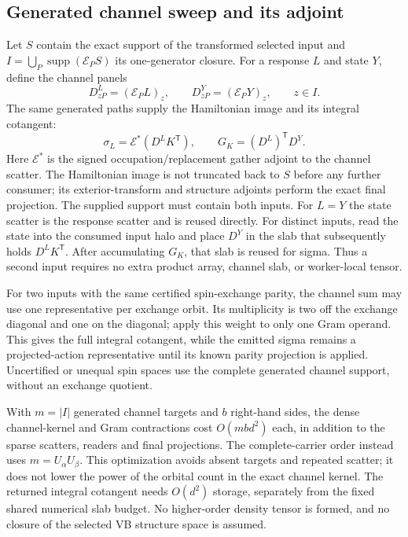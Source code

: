 \documentclass[11pt,a4paper]{article}
\newcommand{\Tr}{^{\mathsf T}}
\newcommand{\Ea}{\mathcal E}
\begin{document}
\subsection{Generated channel sweep and its adjoint}

Let $S$ contain the exact support of the transformed selected input and
$I=\bigcup_P\operatorname{supp}(\Ea_P S)$ its one-generator closure.
For a response $L$ and state $Y$, define the channel panels
\begin{equation}
 D^L_{zP}=(\Ea_P L)_z,\qquad D^Y_{zP}=(\Ea_P Y)_z,
 \qquad z\in I.
\end{equation}
The same generated paths supply the Hamiltonian image and its integral
cotangent:
\begin{equation}
 \sigma_L=\Ea^* (D^L K\Tr),\qquad
 G_K=(D^L)\Tr D^Y.
 \label{eq:tiled-channel-vjp}
\end{equation}
Here $\Ea^*$ is the signed occupation/replacement gather adjoint to the
channel scatter. The Hamiltonian image is not truncated back to $S$ before
any further consumer; its exterior-transform and structure adjoints perform
the exact final projection. The supplied support must contain both inputs.
For $L=Y$ the state scatter is the response scatter and is reused directly.
For distinct inputs, read the state into the consumed input halo and place
$D^Y$ in the slab that subsequently holds $D^L K\Tr$. After accumulating
$G_K$, that slab is reused for sigma. Thus a second input requires no extra
product array, channel slab, or worker-local tensor.

For two inputs with the same certified spin-exchange parity, the channel
sum may use one representative per exchange orbit. Its multiplicity is
two off the exchange diagonal and one on the diagonal; apply this weight
to only one Gram operand. This gives the full integral cotangent, while
the emitted sigma remains a projected-action representative until its
known parity projection is applied. Uncertified or unequal spin spaces
use the complete generated channel support, without an exchange quotient.

With $m=|I|$ generated channel targets and $b$ right-hand sides, the dense
channel-kernel and Gram contractions cost $O(mbd^2)$ each, in addition to
the sparse scatters, readers and final projections. The complete-carrier
order instead uses $m=U_\alpha U_\beta$. This optimization avoids absent
targets and repeated scatter; it does not lower the power of the orbital
count in the exact channel kernel. The returned integral cotangent needs
$O(d^2)$ storage, separately from the fixed shared numerical slab budget.
No higher-order density tensor is formed, and no closure of the selected
VB structure space is assumed.
\end{document}
